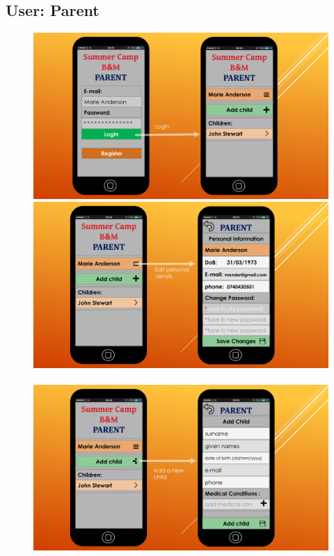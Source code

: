 \documentclass{l3proj}
\begin{document}
\pagebreak
\subsection{User: Parent}

{
\begin{figure}[h]
\includegraphics[scale=0.20]{page-21.jpg}
\includegraphics[scale=0.20]{page-22.jpg}
\\
\\
\includegraphics[scale=0.20]{page-23.jpg}

\end{figure}}
\end{document}
